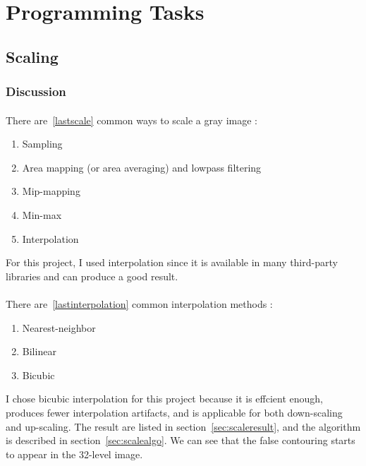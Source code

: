 \documentclass{article}
\begin{document}
\section{Programming Tasks}
\subsection{Scaling}

\subsubsection{Discussion}
\paragraph{}
There are~\ref{lastscale} common ways to scale a gray image \cite{leptonica}:

\begin{enumerate}
\item Sampling
\item Area mapping (or area averaging) and lowpass filtering
\item Mip-mapping
\item Min-max
\item Interpolation \label{lastscale}
\end{enumerate}

For this project, I used interpolation since it is available in many third-party libraries and can produce a good result.

\paragraph{}

There are~\ref{lastinterpolation} common interpolation methods \cite{gonzalez2008digital}:
\begin{enumerate}
\item Nearest-neighbor
\item Bilinear
\item Bicubic \label{lastinterpolation}
\end{enumerate}

I chose bicubic interpolation for this project because it is effcient enough, produces fewer interpolation artifacts, and is applicable for both down-scaling and up-scaling. The result are listed in section~\ref{sec:scaleresult}, and the algorithm is described in section~\ref{sec:scalealgo}. We can see that the false contouring starts to appear in the 32-level image.
\end{document}
